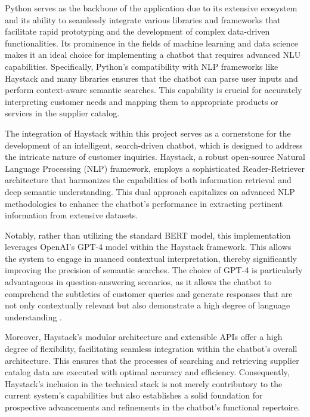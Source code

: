 Python serves as the backbone of the application due to its extensive ecosystem and its ability to seamlessly integrate
various libraries and frameworks that facilitate rapid prototyping and the development of complex data-driven
functionalities.\autocite[cf.][p. 12]{shrivastavaDesignImplementationChatbot}
\autocite[cf.][pp. 240--241]{christensenPythonPipelineRapid2022} Its prominence in the fields of machine
learning and data science makes it an ideal choice for implementing a chatbot that requires advanced \ac{NLU}
capabilities.\autocite[cf.][p. 1]{lortiePythonModernData2022}\autocite[cf.][p. 85]{joshiOverviewPythonLibraries}
Specifically, Python's compatibility with NLP frameworks like Haystack and many libraries ensures that
the chatbot can parse user inputs and perform context-aware semantic searches.
\autocite[cf.][p. 21]{fareezPOPULARPYTHONLIBRARIES2020} This capability is crucial for accurately interpreting customer
needs and mapping them to appropriate products or services in the supplier catalog.

The integration of Haystack within this project serves as a cornerstone for the development of an intelligent,
search-driven chatbot, which is designed to address the intricate nature of customer inquiries. Haystack, a robust
open-source Natural Language Processing (NLP) framework, employs a sophisticated Reader-Retriever architecture that
harmonizes the capabilities of both information retrieval and deep semantic understanding. This dual approach
capitalizes on advanced NLP methodologies to enhance the chatbot’s performance in extracting pertinent information from
extensive datasets\autocite[cf.][p. 236]{krishnamoorthyEvolutionReadingComprehension2021}.

Notably, rather than utilizing the standard BERT model, this implementation leverages OpenAI’s GPT-4 model within the
Haystack framework. This allows the system to engage in nuanced contextual interpretation, thereby significantly
improving the precision of semantic searches. The choice of GPT-4 is particularly advantageous in question-answering
scenarios, as it allows the chatbot to comprehend the subtleties of customer queries and generate responses that are not
only contextually relevant but also demonstrate a high degree of language understanding
\autocite[cf.][pp. 943--944]{syedQuestionAnsweringChatbot2021}.

Moreover, Haystack’s modular architecture and extensible \acp{API} offer a high degree of flexibility, facilitating
seamless integration within the chatbot’s overall architecture. This ensures that the processes of searching and
retrieving supplier catalog data are executed with optimal accuracy and efficiency. Consequently, Haystack’s inclusion
in the technical stack is not merely contributory to the current system’s capabilities but also establishes a solid
foundation for prospective advancements and refinements in the chatbot’s functional repertoire.

